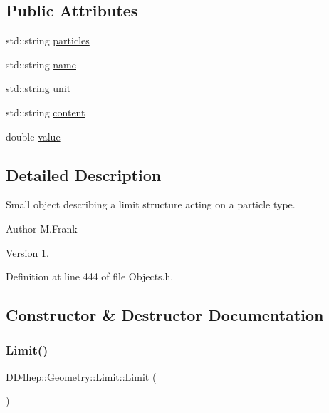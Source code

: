 \subsection*{Public Attributes}
\begin{DoxyCompactItemize}
\item 
std\+::string \hyperlink{class_d_d4hep_1_1_geometry_1_1_limit_a44351a38f5e876a67898568c5ca4d4a6}{particles}
\item 
std\+::string \hyperlink{class_d_d4hep_1_1_geometry_1_1_limit_ad1cec0ce58b0158ef8ba97d0a066cb28}{name}
\item 
std\+::string \hyperlink{class_d_d4hep_1_1_geometry_1_1_limit_a60bf4c5f1e2847c0dde17d54abaffffb}{unit}
\item 
std\+::string \hyperlink{class_d_d4hep_1_1_geometry_1_1_limit_aafcf490f74d6001a5dde9d9c6061e694}{content}
\item 
double \hyperlink{class_d_d4hep_1_1_geometry_1_1_limit_af3c5aac5f2991f137749634caf9e49cc}{value}
\end{DoxyCompactItemize}


\subsection{Detailed Description}
Small object describing a limit structure acting on a particle type. 

\begin{DoxyAuthor}{Author}
M.\+Frank 
\end{DoxyAuthor}
\begin{DoxyVersion}{Version}
1. 
\end{DoxyVersion}


Definition at line 444 of file Objects.\+h.



\subsection{Constructor \& Destructor Documentation}
\hypertarget{class_d_d4hep_1_1_geometry_1_1_limit_af8c3f725caf1e3b50b86e2dbfefad3e1}{}\label{class_d_d4hep_1_1_geometry_1_1_limit_af8c3f725caf1e3b50b86e2dbfefad3e1} 
\subsubsection{\texorpdfstring{Limit()}{Limit()}\hspace{0.1cm}{\footnotesize\ttfamily [1/2]}}
{\footnotesize\ttfamily D\+D4hep\+::\+Geometry\+::\+Limit\+::\+Limit (\begin{DoxyParamCaption}{ }\end{DoxyParamCaption})\hspace{0.3cm}{\ttfamily [inline]}}



